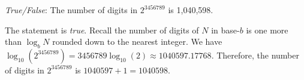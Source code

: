 \documentclass[11pt,letterpaper]{article}
\begin{document}
\quizsol \textit{True/False}: The number of digits in $2^{3456789}$ is 1,040,598. \pspace

\sol The statement is \textit{true}. Recall the number of digits of $N$ in base-$b$ is one more than $\log_b N$ rounded down to the nearest integer. We have $\log_{10}(2^{3456789})= 3456789 \log_{10}(2) \approx 1040597.17768$. Therefore, the number of digits in $2^{3456789}$ is $1040597 + 1= 1040598$.
\end{document}
